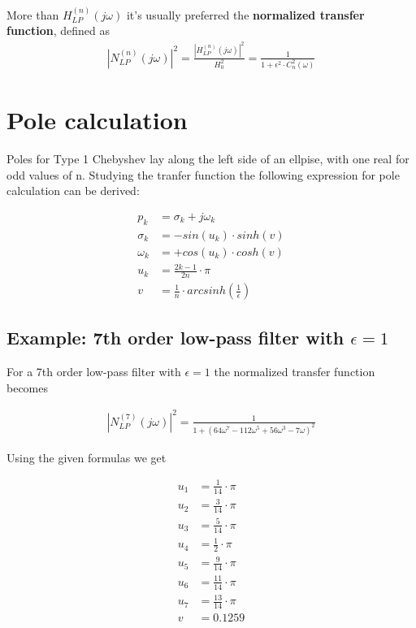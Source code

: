 \documentclass[a4paper,12pt]{report}
\begin{document}
More than $H_{LP}^{(n)}(j\omega)$ it's usually preferred the \textbf{normalized transfer function}, defined as
\begin{align}
|N_{LP}^{(n)}(j\omega)|^2=\frac{|H_{LP}^{(n)}(j\omega)|^2}{H_0^2} = \frac{1}{1 + \epsilon^2\cdot C_n^2(\omega)}
\end{align}

\section{Pole calculation}

Poles for Type 1 Chebyshev lay along the left side of an ellpise, with one real for odd values of n.  
Studying the tranfer function the following expression for pole calculation can be derived:

\begin{align}
	p_k &= \sigma_k + j \omega_k\\
	\sigma_k &= -sin(u_k) \cdot sinh(v)\\
	\omega_k &= +cos(u_k)\cdot cosh(v)\\
	u_k & = \frac{2k-1}{2n}\cdot \pi\\
	v &= \frac{1}{n}\cdot arcsinh \left( \frac{1}{\epsilon} \right)
\end{align}


\newpage
\subsection{Example: 7th order low-pass filter with $\epsilon=1$}

For a 7th order low-pass filter with $\epsilon=1$ the normalized transfer function becomes

\begin{align}
	|N_{LP}^{(7)}(j\omega)|^2 = \frac{1}{1 + (64\omega^7 - 112 \omega^5 + 56\omega^3 - 7\omega)^2}
\end{align}

Using the given formulas we get

\begin{align}
	u_1 & = \frac{1}{14}  \cdot \pi\\
	u_2 & = \frac{3}{14}  \cdot \pi\\
	u_3 & = \frac{5}{14}  \cdot \pi\\
	u_4 & = \frac{1}{2}   \cdot \pi\\
	u_5 & = \frac{9}{14}  \cdot \pi\\
	u_6 & = \frac{11}{14} \cdot \pi\\
	u_7 & = \frac{13}{14} \cdot \pi\\
	v &= 0.1259
\end{align}
\end{document}
